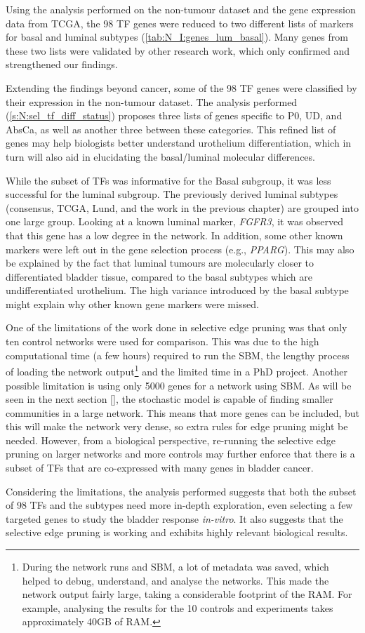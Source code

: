 Using the analysis performed on the non-tumour dataset and the gene expression data from TCGA, the 98 TF genes were reduced to two different lists of markers for basal and luminal subtypes (\cref{tab:N_I:genes_lum_basal}). Many genes from these two lists were validated by other research work, which only confirmed and strengthened our findings.

Extending the findings beyond cancer, some of the 98 TF genes were classified by their expression in the non-tumour dataset. The analysis performed (\cref{s:N:sel_tf_diff_status}) proposes three lists of genes specific to P0, UD, and AbsCa, as well as another three between these categories. This refined list of genes may help biologists better understand urothelium differentiation, which in turn will also aid in elucidating the basal/luminal molecular differences.

While the subset of TFs was informative for the Basal subgroup, it was less successful for the luminal subgroup. The previously derived luminal subtypes (consensus, TCGA, Lund, and the work in the previous chapter) are grouped into one large group. Looking at a known luminal marker, \textit{FGFR3}, it was observed that this gene has a low degree in the network. In addition, some other known markers were left out in the gene selection process (e.g., \textit{PPARG}). This may also be explained by the fact that luminal tumours are molecularly closer to differentiated bladder tissue, compared to the basal subtypes which are undifferentiated urothelium. The high variance introduced by the basal subtype might explain why other known gene markers were missed.

One of the limitations of the work done in selective edge pruning was that only ten control networks were used for comparison. This was due to the high computational time (a few hours) required to run the SBM, the lengthy process of loading the network output\footnote{During the network runs and SBM, a lot of metadata was saved, which helped to debug, understand, and analyse the networks. This made the network output fairly large, taking a considerable footprint of the RAM. For example, analysing the results for the 10 controls and experiments takes approximately 40GB of RAM.} and the limited time in a PhD project. Another possible limitation is using only 5000 genes for a network using SBM. As will be seen in the next section \ref{}, the stochastic model is capable of finding smaller communities in a large network. This means that more genes can be included, but this will make the network very dense, so extra rules for edge pruning might be needed. However, from a biological perspective, re-running the selective edge pruning on larger networks and more controls may further enforce that there is a subset of TFs that are co-expressed with many genes in bladder cancer.

Considering the limitations, the analysis performed suggests that both the subset of 98 TFs and the subtypes need more in-depth exploration, even selecting a few targeted genes to study the bladder response \textit{in-vitro}. It also suggests that the selective edge pruning is working and exhibits highly relevant biological results.
